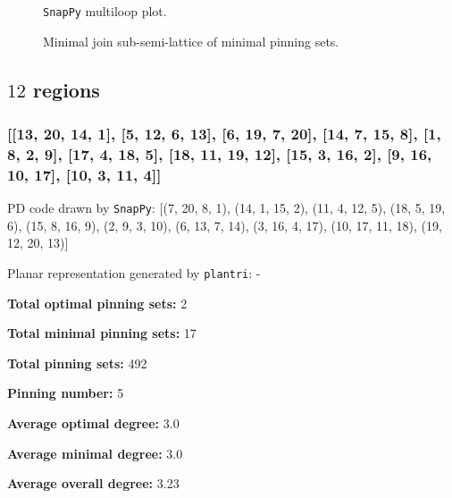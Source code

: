 \documentclass{article}%
\begin{document}
\begin{multicols}{2}
\begin{figure}[H]
\centering

\caption{\texttt{SnapPy} multiloop plot.}
\label{fig:tex/img/[[18, 5, 1, 6], [6, 11, 7, 12], [12, 17, 13, 18], [13, 4, 14, 5], [1, 10, 2, 11], [7, 16, 8, 17], [8, 3, 9, 4], [14, 9, 15, 10], [2, 15, 3, 16]].svg}
\end{figure}
\columnbreak

\begin{figure}[H]
\centering
\scalebox{0.8}{}
\caption{Minimal join sub-semi-lattice of minimal pinning sets.}
\label{fig:tex/img/[[18, 5, 1, 6], [6, 11, 7, 12], [12, 17, 13, 18], [13, 4, 14, 5], [1, 10, 2, 11], [7, 16, 8, 17], [8, 3, 9, 4], [14, 9, 15, 10], [2, 15, 3, 16]].pgf}
\end{figure}
\end{multicols}

\newpage

\subsection{$12$ regions}

\subsubsection{[[13, 20, 14, 1], [5, 12, 6, 13], [6, 19, 7, 20], [14, 7, 15, 8], [1, 8, 2, 9], [17, 4, 18, 5], [18, 11, 19, 12], [15, 3, 16, 2], [9, 16, 10, 17], [10, 3, 11, 4]]}

{\small\noindent PD code drawn by \texttt{SnapPy}: [(7, 20, 8, 1), (14, 1, 15, 2), (11, 4, 12, 5), (18, 5, 19, 6), (15, 8, 16, 9), (2, 9, 3, 10), (6, 13, 7, 14), (3, 16, 4, 17), (10, 17, 11, 18), (19, 12, 20, 13)]}

{\small\noindent Planar representation generated by \texttt{plantri}: -}

\begin{multicols}{2}
{\normalsize \noindent\textbf{Total optimal pinning sets:} 2

\noindent\textbf{Total minimal pinning sets:} 17

\noindent\textbf{Total pinning sets:} 492

\noindent\textbf{Pinning number:} 5

}
\columnbreak

{\normalsize \noindent\textbf{Average optimal degree:} 3.0

\noindent\textbf{Average minimal degree:} 3.0

\noindent\textbf{Average overall degree:} 3.23

}
\end{multicols}
\end{document}
